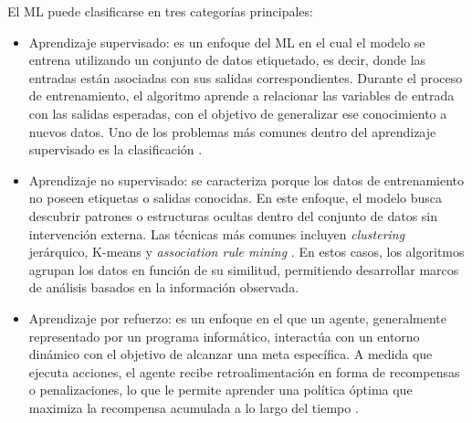 \justify
El ML puede clasificarse en tres categorías principales:

\begin{itemize}
\item Aprendizaje supervisado: es un enfoque del ML en el cual el modelo se entrena utilizando un conjunto de datos etiquetado, es decir, donde las entradas están asociadas con sus salidas correspondientes. Durante el proceso de entrenamiento, el algoritmo aprende a relacionar las variables de entrada con las salidas esperadas, con el objetivo de generalizar ese conocimiento a nuevos datos. Uno de los problemas más comunes dentro del aprendizaje supervisado es la clasificación \cite{murphy2012machine}.

\item Aprendizaje no supervisado: se caracteriza porque los datos de entrenamiento no poseen etiquetas o salidas conocidas. En este enfoque, el modelo busca descubrir patrones o estructuras ocultas dentro del conjunto de datos sin intervención externa. Las técnicas más comunes incluyen \textit{clustering} jerárquico, K-means y \textit{association rule mining} \cite{murphy2012machine}. En estos casos, los algoritmos agrupan los datos en función de su similitud, permitiendo desarrollar marcos de análisis basados en la información observada.

\item Aprendizaje por refuerzo: es un enfoque en el que un agente, generalmente representado por un programa informático, interactúa con un entorno dinámico con el objetivo de alcanzar una meta específica. A medida que ejecuta acciones, el agente recibe retroalimentación en forma de recompensas o penalizaciones, lo que le permite aprender una política óptima que maximiza la recompensa acumulada a lo largo del tiempo \cite{kaelbling1996reinforcement}.
\end{itemize}

